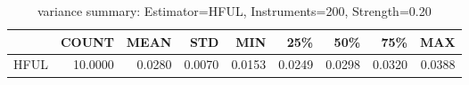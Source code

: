 \begin{table}[ht]
\centering
\caption{variance summary: Estimator=HFUL, Instruments=200, Strength=0.20}
\begin{tabular}{lrrrrrrrr}
\toprule
 & COUNT & MEAN & STD & MIN & 25\% & 50\% & 75\% & MAX \\
\midrule
HFUL & 10.0000 & 0.0280 & 0.0070 & 0.0153 & 0.0249 & 0.0298 & 0.0320 & 0.0388 \\
\bottomrule
\end{tabular}
\end{table}
